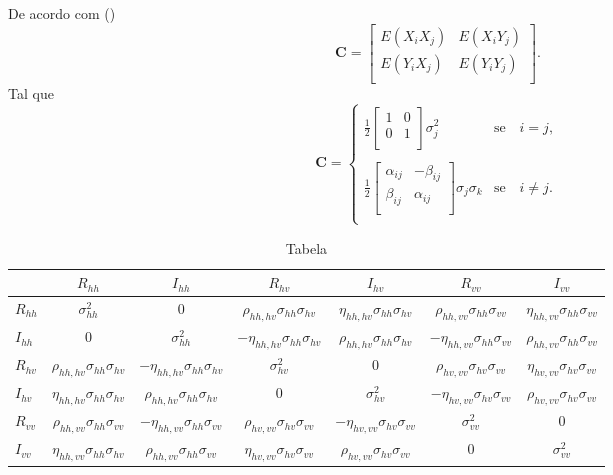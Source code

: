 De acordo com (\cite{good})
\begin{equation}
\mathbf{C} = \left[
\begin{array}{cc}
	E(X_iX_j)  & E(X_iY_j)  \\
	E(Y_iX_j)  & E(Y_iY_j)  \\
\end{array}
\right].
\end{equation}
Tal que
\begin{equation}
\mathbf{C} =
\left\{
\begin{array}{cc}
	\frac{1}{2}\left[
\begin{array}{cc}
	 1 & 0  \\
	 0 & 1  \\
\end{array}
	\right]\sigma^{2}_{j}  & \mbox{se}\quad i=j, \\
	& \\
	\frac{1}{2}\left[
\begin{array}{cc}
	\alpha_{ij} & -\beta_{ij}  \\
	 \beta_{ij} & \alpha_{ij}  \\
\end{array}
	\right]\sigma_j\sigma_k  & \mbox{se}\quad i\neq j.   \\
\end{array}
\right.
\end{equation}

\begin{sidewaystable}
	\centering
	\caption{Tabela}
\begin{tabular}{@{}lcccccc@{}} \toprule
	     &$R_{hh}$        & $I_{hh}$ & $R_{hv}$&$I_{hv}$                            &$R_{vv}$                           &$I_{vv}$ \\ \midrule
$R_{hh}$ &$\sigma_{hh}^2$ & 0                  &$\rho_{hh,hv}\sigma_{hh}\sigma_{hv}$ &$\eta_{hh,hv}\sigma_{hh}\sigma_{hv}$ & $\rho_{hh,vv}\sigma_{hh}\sigma_{vv}$&$\eta_{hh,vv}\sigma_{hh}\sigma_{vv}$  \\ 
	$I_{hh}$ & 0 & $\sigma_{hh}^2$ &$-\eta_{hh,hv}\sigma_{hh}\sigma_{hv}$ &$\rho_{hh,hv}\sigma_{hh}\sigma_{hv}$ &$-\eta_{hh,vv}\sigma_{hh}\sigma_{vv}$ &$\rho_{hh,vv}\sigma_{hh}\sigma_{vv}$  \\ 
	$R_{hv}$ &$\rho_{hh,hv}\sigma_{hh}\sigma_{hv}$   &$-\eta_{hh,hv}\sigma_{hh}\sigma_{hv}$  &$\sigma_{hv}^2$ &0 &$\rho_{hv,vv}\sigma_{hv}\sigma_{vv}$ &$\eta_{hv,vv}\sigma_{hv}\sigma_{vv}$  \\ 
	$I_{hv}$ &$\eta_{hh,hv}\sigma_{hh}\sigma_{hv}$  &$\rho_{hh,hv}\sigma_{hh}\sigma_{hv}$  &0 &$\sigma_{hv}^2$ &$-\eta_{hv,vv}\sigma_{hv}\sigma_{vv}$ &$\rho_{hv,vv}\sigma_{hv}\sigma_{vv}$ \\ 
	$R_{vv}$ &$\rho_{hh,vv}\sigma_{hh}\sigma_{vv}$  &$-\eta_{hh,vv}\sigma_{hh}\sigma_{vv}$  &$\rho_{hv,vv}\sigma_{hv}\sigma_{vv}$ &$-\eta_{hv,vv}\sigma_{hv}\sigma_{vv}$ & $\sigma_{vv}^2$ &0 \\ 
    $I_{vv}$ &$\eta_{hh,vv}\sigma_{hh}\sigma_{hv}$  &$\rho_{hh,vv}\sigma_{hh}\sigma_{vv}$  &$\eta_{hv,vv}\sigma_{hv}\sigma_{vv}$ &$\rho_{hv,vv}\sigma_{hv}\sigma_{vv}$ & 0 &$\sigma_{vv}^2$ \\ 	 \bottomrule
\end{tabular}
\end{sidewaystable}
